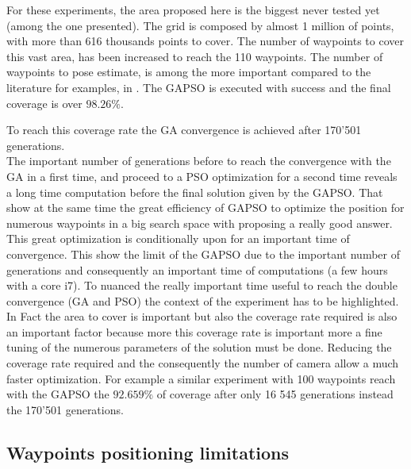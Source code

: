 For these experiments, the area proposed here is the biggest never tested yet (among the one presented). The grid is composed by almost 1 million of points, with more than 616 thousands points to cover. The number of waypoints to cover this vast area, has been increased to reach the 110 waypoints. 
The number of waypoints to pose estimate, is  among the more important compared to the literature for examples, in \citep{8*zhou2011,33*reddy2012,82*chrysostomou2012,143*maji2015, 151*zhao2013, 152*wang2009, 165*jiang2010, 193*fu2014, 181*wang2017, 18*ding2012}. %
The GAPSO is executed with success and the final coverage is over $98.26\%$.  
	
	 To reach this coverage rate the GA convergence is achieved after 170'501 generations. \\
	 The important number of generations before to reach the convergence with the GA in a first time, and  proceed to a PSO optimization for a second time reveals a long time computation before the final solution given by the GAPSO. 
	 That show at the same time the great efficiency of GAPSO to optimize the position for numerous waypoints in a big search space with proposing a really good answer. This great optimization is conditionally upon for an important time of convergence. This show the limit of the GAPSO due to the important number of generations and consequently an important time  of computations (a few hours with a core i7).  
	 To nuanced the really important time useful to reach the double convergence (GA and PSO) the context of the experiment has to be highlighted. In Fact the area to cover is important but also the coverage rate required is also an important factor because more this coverage rate is important more a fine tuning of the numerous parameters of the solution must be done. 
	 Reducing the coverage rate required and the consequently the number of camera  allow a much faster optimization. For example a similar experiment with  100 waypoints reach with the GAPSO  the $92.659\%$ of coverage after only 16 545 generations instead the 170'501 generations. 
	
	\subsection{Waypoints positioning limitations} \label{sec:waypointPoseLimite}
	
